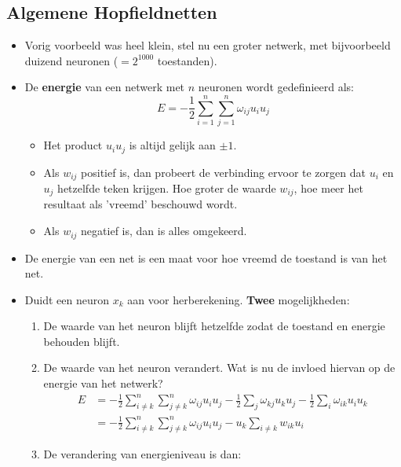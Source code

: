 \subsection{Algemene Hopfieldnetten}
\begin{itemize}
    \item Vorig voorbeeld was heel klein, stel nu een groter netwerk, met bijvoorbeeld duizend neuronen ($= 2^{1000}$ toestanden).
    \item De \textbf{energie} van een netwerk met $n$ neuronen wordt gedefinieerd als:
    $$E = -\frac{1}{2}\sum_{i=1}^{n}\sum_{j=1}^{n} \omega_{ij}u_iu_j$$ 
    \begin{itemize}
        \item Het product $u_iu_j$ is altijd gelijk aan $\pm 1$.
        \item Als $w_{ij}$ positief is, dan probeert de verbinding ervoor te zorgen dat $u_i$ en $u_j$ hetzelfde teken krijgen. Hoe groter de waarde $w_{ij}$, hoe meer het resultaat als 'vreemd' beschouwd wordt.
        \item Als $w_{ij}$ negatief is, dan is alles omgekeerd.
    \end{itemize}
    \item De energie van een net is een maat voor hoe vreemd de toestand is van het net.
    \item Duidt een neuron $x_k$ aan voor herberekening. \textbf{Twee} mogelijkheden:
    \begin{enumerate}
        \item De waarde van het neuron blijft hetzelfde zodat de toestand en energie behouden blijft.
        \item De waarde van het neuron verandert. Wat is nu de invloed hiervan op de energie van het netwerk?
        \begin{align*}
          E & = -\frac{1}{2}\sum_{i \neq k}^{n}\sum_{j \neq k}^{n} \omega_{ij}u_iu_j  -\frac{1}{2}\sum_{j} \omega_{kj}u_ku_j   -\frac{1}{2}\sum_{i} \omega_{ik}u_iu_k  \\
            & = -\frac{1}{2}\sum_{i \neq k}^{n}\sum_{j \neq k}^{n} \omega_{ij}u_iu_j -u_k\sum_{i \neq k}w_{ik}u_i
        \end{align*}
        \item De verandering van energieniveau is dan:

    \end{enumerate}
\end{itemize}
